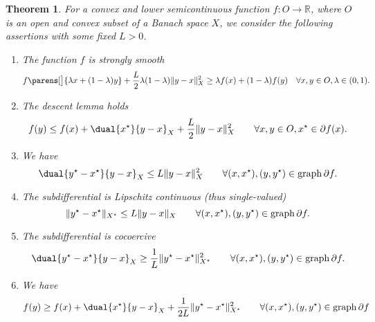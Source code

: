 \documentclass[
	english
]{scrartcl}
\numberwithin{equation}{section} %
\DeclarePairedDelimiter\norm{\lVert}{\rVert}
\DeclarePairedDelimiter\parens()
\newcommand\R{\mathbb{R}}
\newcommand{\dualspace}{^\star}
\newcommand{\graph}{\operatorname{graph}}
\newtheorem{theorem}{Theorem}[section]
\begin{document}
\begin{theorem}
	\label{thm:smoothnes}
	For a convex and lower semicontinuous function
	$f \colon O \to \R$,
	where $O$ is an open and convex subset of a Banach space $X$,
	we consider the following assertions
	with some fixed $L > 0$.
	\begin{enumerate}
		\item
			\label{item:smoothnes:1}
			The function $f$ is strongly smooth
			\begin{equation*}
				f\parens[\big]{ \lambda x + (1-\lambda) y}
				+
				\frac{L}{2} \lambda (1-\lambda) \norm{y - x}_X^2
				\ge
				\lambda f(x) + (1-\lambda) f(y)
				\quad\forall x,y \in O, \lambda \in (0,1)
				.
			\end{equation*}
		\item
			\label{item:smoothnes:2}
			The descent lemma holds
			\begin{equation*}
				f(y) \le f(x) + \dual{x\dualspace}{y - x}_X + \frac L2 \norm{y - x}_X^2
				\qquad\forall x,y \in O, x\dualspace\in \partial f(x)
				.
			\end{equation*}
		\item
			\label{item:smoothnes:6}
			We have
			\begin{equation*}
				\dual{y\dualspace - x\dualspace}{y - x}_X \le L \norm{y - x}_{X}^2
				\qquad \forall (x,x\dualspace), (y,y\dualspace) \in \graph \partial f
				.
			\end{equation*}
		\item
			\label{item:smoothnes:5}
			The subdifferential is Lipschitz continuous
			(thus single-valued)
			\begin{equation*}
				\norm{y\dualspace - x\dualspace}_{X\dualspace} \le L \norm{y - x}_X
				\qquad \forall (x,x\dualspace), (y,y\dualspace) \in \graph \partial f
				.
			\end{equation*}
		\item
			\label{item:smoothnes:4}
			The subdifferential is cocoercive
			\begin{equation*}
				\dual{y\dualspace - x\dualspace}{y - x}_X \ge \frac1L \norm{y\dualspace - x\dualspace}_{X\dualspace}^2
				\qquad \forall (x,x\dualspace), (y,y\dualspace) \in \graph \partial f
				.
			\end{equation*}
		\item
			\label{item:smoothnes:3}
			We have
			\begin{equation*}
				f(y) \ge f(x) + \dual{x\dualspace}{y - x}_X + \frac 1{2 L} \norm{y\dualspace - x\dualspace}_{X\dualspace}^2
				\qquad \forall (x,x\dualspace), (y,y\dualspace) \in \graph \partial f

\end{equation*}
\end{enumerate}
\end{theorem}
\end{document}
